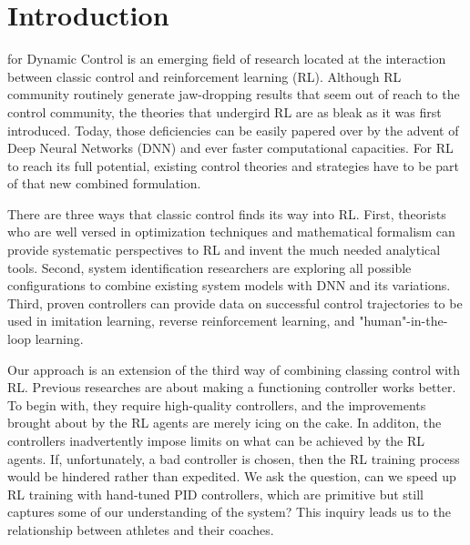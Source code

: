 \documentclass[journal]{IEEEtran}
\begin{document}
\section{Introduction}
 for Dynamic Control is an emerging field of research located at the interaction between classic control and reinforcement learning (RL). Although RL community routinely generate jaw-dropping results that seem out of reach to the control community\cite{Mnih2013PlayingAW}\cite{Hausknecht2015DeepRQ}, the theories that undergird RL are as bleak as it was first introduced\cite{Bertsekas1996NeuroDynamicP}. Today, those deficiencies can be easily papered over by the advent of Deep Neural Networks (DNN) and ever faster computational capacities. For RL to reach its full potential, existing control theories and strategies have to be part of that new combined formulation.

There are three ways that classic control finds its way into RL. First, theorists who are well versed in optimization techniques and mathematical formalism can provide systematic perspectives to RL and invent the much needed analytical tools\cite{Han2020ActorCriticRL}\cite{Weinan2017APO}\cite{Dupont2019AugmentedNO}\cite{Betancourt2018OnSO}\cite{Nachum2020ReinforcementLV}. Second, system identification researchers are exploring all possible configurations to combine existing system models with DNN and its variations\cite{Hewing2020LearningBasedMP}\cite{Mohan2020EmbeddingHP}\cite{Lusch2018DeepLF}\cite{Bai2019DeepEM}\cite{BelbutePeres2020CombiningDP}. Third, proven controllers can provide data on successful control trajectories to be used in imitation learning, reverse reinforcement learning, and "human"-in-the-loop learning\cite{Xie2018LearningWT}\cite{Carlucho2017IncrementalQS}\cite{Pavse2020RIDMRI}.

Our approach is an extension of the third way of combining classing control with RL. Previous researches are about making a functioning controller works better. To begin with, they require high-quality controllers, and the improvements brought about by the RL agents are merely icing on the cake. In additon, the controllers inadvertently impose limits on what can be achieved by the RL agents. If, unfortunately, a bad controller is chosen, then the RL training process would be hindered rather than expedited. We ask the question, can we speed up RL training with hand-tuned PID controllers, which are primitive but still captures some of our understanding of the system? This inquiry leads us to the relationship between athletes and their coaches. 
\end{document}
